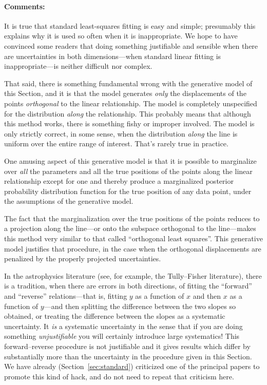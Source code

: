 \documentclass[12pt,twoside]{article}
\newcommand{\sectionname}{Section}
\newcommand{\commentsname}{Comments}
\newenvironment{comments}{\paragraph{\commentsname:}}{}
\begin{document}
\begin{comments}
It is true that standard least-squares fitting is easy and simple;
presumably this explains why it is used so often when it is
inappropriate.  We hope to have convinced some readers that doing something
justifiable and sensible when there are uncertainties in both
dimensions---when standard linear fitting is inappropriate---is
neither difficult nor complex.

That said, there is something fundamental wrong with the generative
model of this \sectionname, and it is that the model generates
\emph{only} the displacements of the points \emph{orthogonal} to the
linear relationship.  The model is completely unspecified for the
distribution \emph{along} the relationship.  This probably means that
although this method works, there is something fishy or improper
involved.  The model is only strictly correct, in some sense, when the
distribution \emph{along} the line is uniform over the entire range of
interest.  That's rarely true in practice.

One amusing aspect of this generative model is that it is possible to
marginalize over \emph{all} the parameters and all the true positions
of the points along the linear relationship except for one and thereby
produce a marginalized posterior probability distribution function for
the true position of any data point, under the assumptions of the
generative model.

The fact that the marginalization over the true positions of the
points reduces to a projection along the line---or onto the subspace
orthogonal to the line---makes this method very similar to that called
``orthogonal least squares''.  This generative model justifies that
procedure, in the case when the orthogonal displacements are penalized
by the properly projected uncertainties.

In the astrophysics literature (see, for example, the Tully--Fisher
literature), there is a tradition, when there are errors in both
directions, of fitting the ``forward'' and ``reverse''
relations---that is, fitting $y$ as a function of $x$ and then $x$ as
a function of $y$---and then splitting the difference between the two
slopes so obtained, or treating the difference between the slopes as a
systematic uncertainty.  It \emph{is} a systematic uncertainty in the
sense that if you are doing something \emph{unjustifiable} you will
certainly introduce large systematics!  This forward--reverse
procedure is not justifiable and it gives results which differ by
substantially more than the uncertainty in the procedure given in this
\sectionname.  We have already (\sectionname~\ref{sec:standard})
criticized one of the principal papers to promote this kind of hack,
and do not need to repeat that criticism here.


\end{comments}
\end{document}
